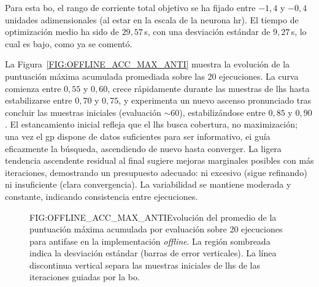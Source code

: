 Para esta \ac{bo}, el rango de corriente total objetivo se ha fijado entre $-1{,}4$ y $-0{,}4$\,unidades adimensionales (al estar en la escala de la neurona \ac{hr}). El tiempo de optimización medio ha sido de $29{,}57$\,s, con una desviación estándar de $9{,}27$\,s, lo cual es bajo, como ya se comentó.

La Figura~\ref{FIG:OFFLINE_ACC_MAX_ANTI} muestra la evolución de la puntuación máxima acumulada promediada sobre las 20 ejecuciones. La curva comienza entre $0{,}55$ y $0{,}60$, crece rápidamente durante las muestras de \ac{lhs} hasta estabilizarse entre $0{,}70$ y $0{,}75$, y experimenta un nuevo ascenso pronunciado tras concluir las muestras iniciales (evaluación $\sim 60$), estabilizándose entre $0{,}85$ y $0{,}90$. El estancamiento inicial refleja que el \ac{lhs} busca cobertura, no maximización; una vez el \ac{gp} dispone de datos suficientes para ser informativo, \ac{ei} guía eficazmente la búsqueda, ascendiendo de nuevo hasta converger. La ligera tendencia ascendente residual al final sugiere mejoras marginales posibles con más iteraciones, demostrando un presupuesto adecuado: ni excesivo (sigue refinando) ni insuficiente (clara convergencia). La variabilidad se mantiene moderada y constante, indicando consistencia entre ejecuciones.

\begin{figure}[Promedio de la puntuación máxima acumulada por evaluación de la \acl{bo} \textit{offline} en antifase]{FIG:OFFLINE_ACC_MAX_ANTI}{Evolución del promedio de la puntuación máxima acumulada por evaluación sobre 20 ejecuciones para antifase en la implementación \textit{offline}. La región sombreada indica la desviación estándar (barras de error verticales). La línea discontinua vertical separa las muestras iniciales de \ac{lhs} de las iteraciones guiadas por la \ac{bo}.}
\end{figure}


